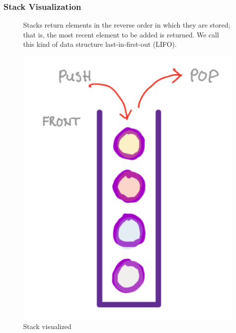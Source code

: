 \subsubsection{Stack Visualization}
\begin{figure}[H]
	\centering 
	\begin{minipage}[b]{0.45\textwidth}
		\raggedright
		Stacks return elements in the reverse order in which they are stored; that is, the most recent element to be added is returned. We call this kind of data structure last-in-first-out (LIFO).
	\end{minipage}
	\hfill
	\begin{minipage}[c]{0.3\textwidth}
		\centering
		\includegraphics[width=\linewidth]{figures/stack-animation}
		\caption{Stack visualized}
	\end{minipage}
\end{figure}

